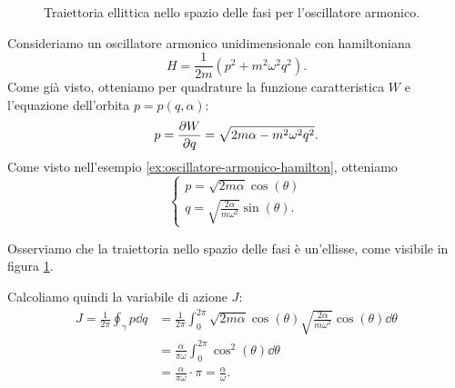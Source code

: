 \begin{example}
    \begin{figure}[h]
            \centering
            \caption{Traiettoria ellittica nello spazio delle fasi per l'oscillatore armonico.}
            \label{fig:ellisse-oscillatore}
    \end{figure}

    Consideriamo un oscillatore armonico unidimensionale con hamiltoniana
    \begin{equation*}
        H = \frac{1}{2m}(p^2 + m^2 \omega^2 q^2).
    \end{equation*}
    Come già visto, otteniamo per quadrature la funzione caratteristica $W$ e l'equazione dell'orbita $p=p(q, \alpha)$:
    \begin{equation*}
        p = \pdv{W}{q} = \sqrt{2m\alpha - m^2 \omega^2 q^2}.
    \end{equation*}
    Come visto nell'esempio \ref{ex:oscillatore-armonico-hamilton}, otteniamo
    \begin{equation*}
        \begin{cases}
            p = \sqrt{2m\alpha} \cos(\theta) \\
            q = \sqrt{\frac{2\alpha}{m\omega^2}} \sin(\theta).
        \end{cases}
    \end{equation*}

    Osserviamo che la traiettoria nello spazio delle fasi è un'ellisse, come visibile in figura \ref{fig:ellisse-oscillatore}.

    Calcoliamo quindi la variabile di azione $J$:
    \begin{align*}
        J = \frac{1}{2\pi} \oint_\gamma p \dd{q} &= \frac{1}{2\pi} \int_0^{2\pi} \sqrt{2m\alpha} \cos(\theta) \sqrt{\frac{2\alpha}{m\omega^2}} \cos(\theta) \dd{\theta} \\
        & = \frac{\alpha}{\pi \omega} \int_0^{2\pi} \cos^2(\theta) \dd{\theta} \\
        & = \frac{\alpha}{\pi \omega} \cdot \pi = \frac{\alpha}{\omega}.
    \end{align*}
\end{example}